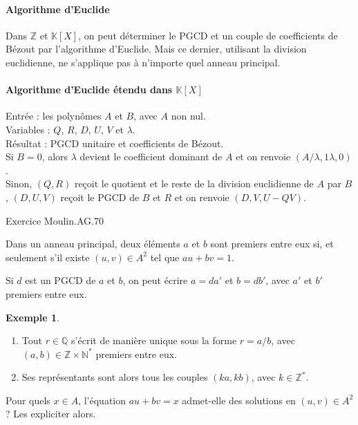 \documentclass[french]{article}
\newcommand{\N}{\mathbb{N}}
\newcommand{\Z}{\mathbb{Z}}
\newcommand{\Q}{\mathbb{Q}}
\newcommand{\K}{\mathbb{K}}
\newcommand{\st}{^*}
\theoremstyle{plain}
\theoremstyle{definition}
\newtheorem*{ex}{Exemple}
\theoremstyle{remark}
\begin{document}
\paragraph{Algorithme d'Euclide}
Dans $\Z$ et $\K[X]$, on peut déterminer le PGCD et un couple de coefficients de Bézout par l'algorithme d'Euclide. Mais ce dernier, utilisant la division euclidienne, ne s'applique pas à n'importe quel anneau principal.

\paragraph{Algorithme d'Euclide étendu dans $\K[X]$}
Entrée : les polynômes $A$ et $B$, avec $A$ non nul.\\
Variables : $Q$, $R$, $D$, $U$, $V$ et $\lambda$.\\
Résultat : PGCD unitaire et coefficients de Bézout.\\
Si $B=0$, alors $\lambda$ devient le coefficient dominant de $A$ et on renvoie $(A/\lambda,1\lambda,0)$.\\
Sinon, $(Q,R)$ reçoit le quotient et le reste de la division euclidienne de $A$ par $B$, $(D,U,V)$ reçoit le PGCD de $B$ et $R$ et on renvoie $(D,V,U-QV)$.\\ \par Exercice Moulin.AG.70

\begin{prop}%
	Dans un anneau principal, deux éléments $a$ et $b$ sont premiers entre eux si, et seulement s'il existe $(u,v)\in A^2$ tel que $au+bv=1$.
\end{prop}

\begin{met}
	Si $d$ est un PGCD de $a$ et $b$, on peut écrire $a=da'$ et $b=db'$, avec $a'$ et $b'$ premiers entre eux.
\end{met}

\begin{ex}
	\begin{enumerate}
		\item Tout $r\in\Q$ s'écrit de manière unique sous la forme $r=a/b$, avec $(a,b)\in\Z\times\N\st$ premiers entre eux.
		\item Ses représentants sont alors tous les couples $(ka,kb)$, avec $k\in\Z\st$.
	\end{enumerate}
\end{ex}

\begin{exo}
	Pour quels $x\in A$, l'équation $au+bv=x$ admet-elle des solutions en $(u,v)\in A^2$ ? Les expliciter alors.
\end{exo}
\end{document}
